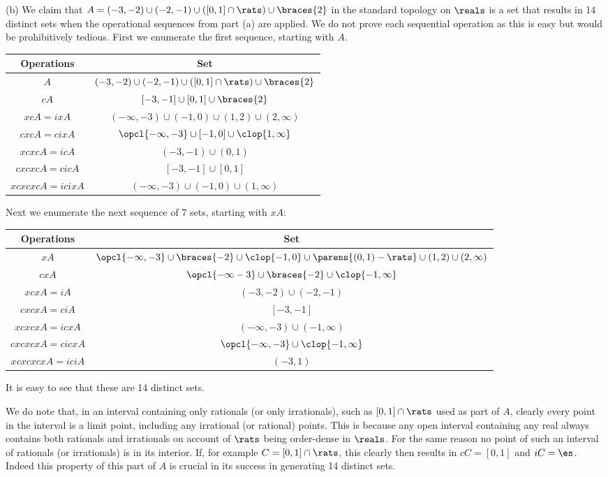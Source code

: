 {  (b) We claim that $A = (-3, -2) \cup (-2, -1)  \cup ([0,1] \cap \rats) \cup \braces{2}$ in the standard topology on $\reals$ is a set that results in 14 distinct sets when the operational sequences from part (a) are applied.
  We do not prove each sequential operation as this is easy but would be prohibitively tedious.
  First we enumerate the first sequence, starting with $A$.
  \begin{center}
    \begin{tabular}{c|c}
      Operations & Set \\
      \hline
      $A$ & $(-3, -2) \cup (-2, -1) \cup ([0,1] \cap \rats) \cup \braces{2}$ \\
      $cA$ & $[-3,-1] \cup [0,1] \cup \braces{2}$ \\
      $xcA = ixA$ & $(-\infty, -3) \cup (-1, 0) \cup (1,2) \cup (2, \infty)$ \\
      $cxcA = cixA$ & $\opcl{-\infty, -3} \cup [-1,0] \cup \clop{1, \infty}$ \\
      $xcxcA = icA$ & $(-3, -1) \cup (0, 1)$ \\
      $cxcxcA = cicA$ & $[-3, -1] \cup [0, 1]$ \\
      $xcxcxcA = icixA$ & $(-\infty, -3) \cup (-1,0) \cup (1, \infty)$
    \end{tabular}
  \end{center}
  Next we enumerate the next sequence of 7 sets, starting with $xA$:
  \begin{center}
    \begin{tabular}{c|c}
      Operations & Set \\
      \hline
      $xA$ & $\opcl{-\infty,-3} \cup \braces{-2} \cup \clop{-1,0} \cup \parens{(0,1) - \rats} \cup (1,2) \cup (2, \infty)$ \\
      $cxA$ & $\opcl{-\infty -3} \cup \braces{-2} \cup \clop{-1, \infty}$ \\
      $xcxA = iA$ & $(-3, -2) \cup (-2, -1)$ \\
      $cxcxA = ciA$ & $[-3, -1]$ \\
      $xcxcxA = icxA$ & $(-\infty, -3) \cup (-1, \infty)$ \\
      $cxcxcxA = cicxA$ & $\opcl{-\infty, -3} \cup \clop{-1, \infty}$ \\
      $xcxcxcxA = iciA$ & $(-3, 1)$
    \end{tabular}
  \end{center}
  It is easy to see that these are 14 distinct sets.

  We do note that, in an interval containing only rationals (or only irrationals), such as $[0,1] \cap \rats$ used as part of $A$, clearly every point in the interval is a limit point, including any irrational (or rational) points.
  This is because any open interval containing any real always contains both rationals and irrationals on account of $\rats$ being order-dense in $\reals$.
  For the same reason no point of such an interval of rationals (or irrationals) is in its interior.
  If, for example $C = [0,1] \cap \rats$, this clearly then results in $cC = [0,1]$ and $iC = \es$.
  Indeed this property of this part of $A$ is crucial in its success in generating 14 distinct sets.
}
